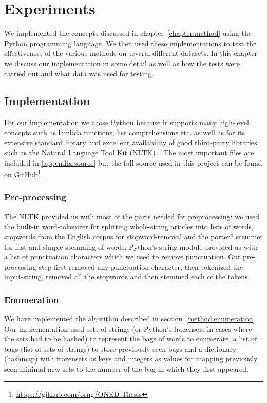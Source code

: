 \chapter{Experiments}
\label{chapter:experiments}

We implemented the concepts discussed in chapter~\ref{chapter:method} using the Python programming language. We then used these implementations to test the effectiveness of the various methods on several different datasets. In this chapter we discuss our implementation in some detail as well as how the tests were carried out and what data was used for testing.

\section{Implementation}
For our implementation we chose Python because it supports many high-level concepts such as lambda functions, list comprehensions etc. as well as for its extensive standard library and excellent availability of good third-party libraries such as the Natural Language Tool Kit (NLTK)~\cite{nltk}. The most important files are included in \cref{appendix:source} but the full source used in this project can be found on GitHub\footnote{\url{https://github.com/orng/ONED-Thesis}}.

\subsection{Pre-processing}
The NLTK provided us with most of the parts needed for preprocessing: we used the built-in word-tokenizer for splitting whole-string articles into lists of words,  stopwords from the English corpus for stopword-removal and the porter2 stemmer for fast and simple stemming of words. Python's string module provided us with a list of punctuation characters which we used to remove punctuation. Our pre-processing step first removed any punctuation character, then tokenized the input-string, removed all the stopwords and then stemmed each of the tokens.

\subsection{Enumeration}
We have implemented the algorithm described in section~\ref{method:enumeration}. Our implementation used sets of strings (or Python's frozensets in cases where the sets had to be hashed) to represent the bags of words to enumerate, a list of bags (list of sets of strings) to store previously seen bags and a dictionary (hashmap) with frozensets as keys and integers as values for mapping previously seen minimal new sets to the number of the bag in which they first appeared. %

